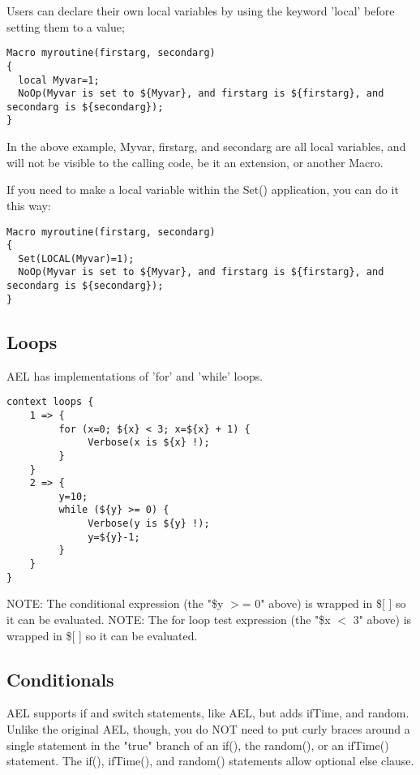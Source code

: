 {Users can declare their own local variables by using the keyword 'local'
before setting them to a value;

\begin{verbatim}
Macro myroutine(firstarg, secondarg)
{
  local Myvar=1;
  NoOp(Myvar is set to ${Myvar}, and firstarg is ${firstarg}, and secondarg is ${secondarg});
}
\end{verbatim}

In the above example, Myvar, firstarg, and secondarg are all local variables,
and will not be visible to the calling code, be it an extension, or another Macro. 

If you need to make a local variable within the Set() application, you can do it this way:

\begin{verbatim}
Macro myroutine(firstarg, secondarg)
{
  Set(LOCAL(Myvar)=1);
  NoOp(Myvar is set to ${Myvar}, and firstarg is ${firstarg}, and secondarg is ${secondarg});
}
\end{verbatim}


\subsection{Loops}

AEL has implementations of 'for' and 'while' loops.

\begin{verbatim}
context loops {
    1 => {
         for (x=0; ${x} < 3; x=${x} + 1) {
              Verbose(x is ${x} !);
         }
    }
    2 => {
         y=10;
         while (${y} >= 0) {
              Verbose(y is ${y} !);
              y=${y}-1;
         }
    }
}
\end{verbatim}

NOTE: The conditional expression (the "\${y} $>$= 0" above) is wrapped in
      \$[ ] so it can be evaluated.  NOTE: The for loop test expression
      (the "\${x} $<$ 3" above) is wrapped in \$[ ] so it can be evaluated.



\subsection{Conditionals}

AEL supports if and switch statements, like AEL, but adds ifTime, and
random. Unlike the original AEL, though, you do NOT need to put curly
braces around a single statement in the "true" branch of an if(), the
random(), or an ifTime() statement. The if(), ifTime(), and random()
statements allow optional else clause.

}
